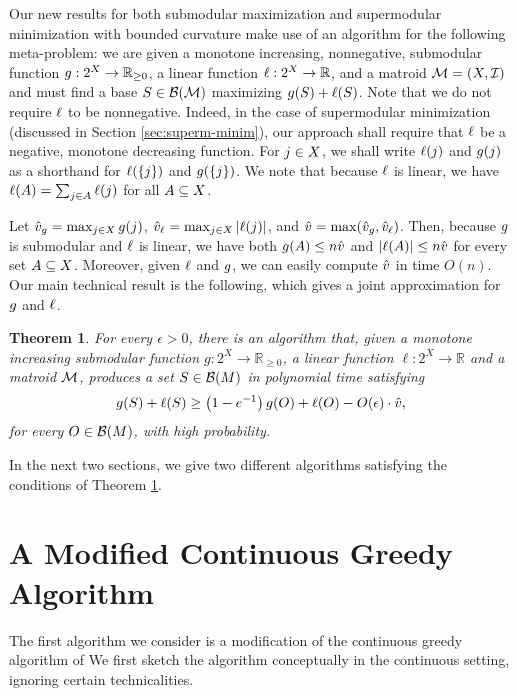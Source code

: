 \documentclass{article}
\newcommand{\reals}{\ensuremath{\mathbb{R}}}
\newcommand{\posreals}{\ensuremath{\reals_{\ge 0}}}
\newtheorem{theorem}{Theorem}[section]
\theoremstyle{definition}
\begin{document}
Our new results for both submodular maximization and supermodular minimization with bounded curvature make use of an algorithm for the following meta-problem: we are given a monotone increasing, nonnegative, submodular function $\submod : 2^{\ground} \to \posreals$, a linear function $\lin:2^{\ground}\to \reals$, and a matroid  $\mathcal{M}=(X,\mathcal{I})$ and must find a base $S \in \mathcal{B}(\mathcal{M})$ maximizing $g(S) + \ell(S)$.  Note that we do not require $\ell$ to be nonnegative.  Indeed, in the case of supermodular minimization (discussed in Section \ref{sec:superm-minim}), our approach shall require that $\ell$ be a negative, monotone decreasing function.  For $j \in X$, we shall write $\ell(j)$ and $g(j)$ as a shorthand for $\ell(\{j\})$ and $g(\{j\})$.  We note that because $\ell$ is linear, we have $\ell(A) = \sum_{j \in A}\ell(j)$ for all $A \subseteq X$.

Let $\hat{v}_g = \max_{j \in X}g(j)$, $\hat{v}_\ell = \max_{j \in X}|\ell(j)|$, and $\hat{v} = \max(\hat{v}_g,\hat{v}_\ell)$.  Then, because $g$ is submodular and $\ell$ is linear, we have both $g(A) \le n\hat{v}$ and $|\ell(A)| \le n\hat{v}$ for every set $A \subseteq X$.  Moreover, given $\ell$ and $g$, we can easily compute $\hat{v}$ in time $O(n)$.  Our main technical result is the following, which gives a joint approximation for $g$ and $\ell$.

\begin{theorem}
\label{thm:main}
For every $\epsilon > 0$, there is an algorithm that, given a monotone increasing submodular function $g:2^X \rightarrow \posreals$, a linear function $\ell:2^X \rightarrow \reals$ and a matroid $\mathcal{M}$, produces a set $S \in \mathcal{B}(M)$ in polynomial time satisfying
\begin{equation*}
g(S) + \ell(S) \ge \left(1-e^{-1}\right)g(O) + \ell(O) - O(\epsilon)\cdot \hat{v},
\end{equation*}
for every $O \in \mathcal{B}(M)$, with high probability.
\end{theorem}
In the next two sections, we give two different algorithms satisfying the conditions of Theorem \ref{thm:main}.

\section{A Modified Continuous Greedy Algorithm}
\label{sec:cont-greedy}
The first algorithm we consider is a modification of the continuous greedy algorithm of \cite{Calinescu2011}
We first sketch the algorithm conceptually in the continuous setting, ignoring certain technicalities.  
\end{document}
